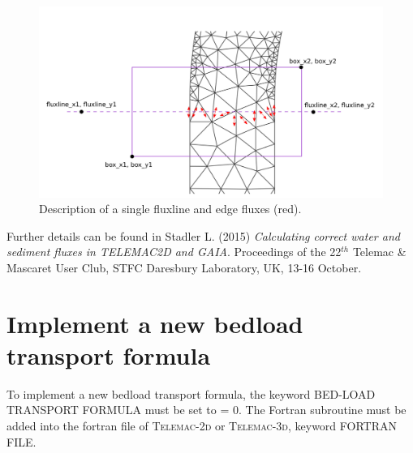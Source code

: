 {\begin{figure}[H]
\begin{center}
\includegraphics[scale=0.25,angle=0]{graphics/fluxline_example.png}
\caption{Description of a single fluxline and edge fluxes (red).}\label{fig:fluxline_example}
\end{center}
\end{figure}

Further details can be found in Stadler L. (2015) \textit{Calculating correct water and sediment fluxes in TELEMAC2D and GAIA}. Proceedings of the 22$^{th}$
Telemac \& Mascaret User Club, STFC Daresbury Laboratory, UK, 13-16 October.

\section{Implement a new bedload transport formula}
To implement a new bedload transport formula, the keyword {\ttfamily BED-LOAD TRANSPORT FORMULA} must be set to {\ttfamily = 0}. The Fortran subroutine must be added into the fortran file of \textsc{Telemac-2d} or \textsc{Telemac-3d}, keyword {\ttfamily FORTRAN FILE}.

}
